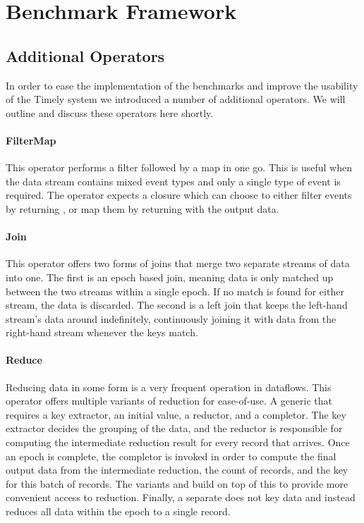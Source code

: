\section{Benchmark Framework}


\subsection{Additional Operators}
In order to ease the implementation of the benchmarks and improve the usability of the Timely system we introduced a number of additional operators. We will outline and discuss these operators here shortly.

\paragraph{FilterMap}
This operator performs a filter followed by a map in one go. This is useful when the data stream contains mixed event types and only a single type of event is required. The operator expects a closure which can choose to either filter events by returning , or map them by returning  with the output data.

\paragraph{Join}
This operator offers two forms of joins that merge two separate streams of data into one. The first is an epoch based join, meaning data is only matched up between the two streams within a single epoch. If no match is found for either stream, the data is discarded. The second is a left join that keeps the left-hand stream's data around indefinitely, continuously joining it with data from the right-hand stream whenever the keys match.

\paragraph{Reduce}
Reducing data in some form is a very frequent operation in dataflows. This operator offers multiple variants of reduction for ease-of-use. A generic  that requires a key extractor, an initial value, a reductor, and a completor. The key extractor decides the grouping of the data, and the reductor is responsible for computing the intermediate reduction result for every record that arrives. Once an epoch is complete, the completor is invoked in order to compute the final output data from the intermediate reduction, the count of records, and the key for this batch of records. The variants  and  build on top of this to provide more convenient access to reduction. Finally, a separate  does not key data and instead reduces all data within the epoch to a single record.

